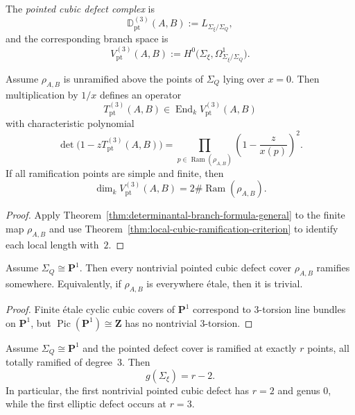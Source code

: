 \begin{definition}
\label{def:pointed-cubic-defect-complex}
The \emph{pointed cubic defect complex} is
\[
\mathbb D^{(3)}_{\mathrm{pt}}(A,B):=L_{\Sigma_{\xi}/\Sigma_Q},
\]
and the corresponding branch space is
\[
V^{(3)}_{\mathrm{pt}}(A,B):=
H^0\bigl(\Sigma_{\xi},\Omega^1_{\Sigma_{\xi}/\Sigma_Q}\bigr).
\]
\end{definition}

\begin{corollary}
\label{cor:pointed-cubic-defect-operator}
Assume $\rho_{A,B}$ is unramified above the points of $\Sigma_Q$ lying over
$x=0$.  Then multiplication by $1/x$ defines an operator
\[
T^{(3)}_{\mathrm{pt}}(A,B)
\in \operatorname{End}_k V^{(3)}_{\mathrm{pt}}(A,B)
\]
with characteristic polynomial
\[
\det\bigl(1-zT^{(3)}_{\mathrm{pt}}(A,B)\bigr)
=
\prod_{p\in \operatorname{Ram}(\rho_{A,B})}
\left(1-\frac{z}{x(p)}\right)^2.
\]
If all ramification points are simple and finite, then
\[
\dim_k V^{(3)}_{\mathrm{pt}}(A,B)
=2\#\operatorname{Ram}(\rho_{A,B}).
\]
\end{corollary}

\begin{proof}
Apply Theorem~\ref{thm:determinantal-branch-formula-general} to the finite map
$\rho_{A,B}$ and use Theorem~\ref{thm:local-cubic-ramification-criterion} to
identify each local length with~$2$.
\end{proof}

\begin{corollary}
\label{cor:no-etale-cubic-defect-rational-sheet}
Assume $\Sigma_Q\cong \mathbf P^1$.  Then every nontrivial pointed cubic defect
cover $\rho_{A,B}$ ramifies somewhere.  Equivalently, if
$\rho_{A,B}$ is everywhere étale, then it is trivial.
\end{corollary}

\begin{proof}
Finite étale cyclic cubic covers of $\mathbf P^1$ correspond to $3$-torsion line
bundles on $\mathbf P^1$, but
$\operatorname{Pic}(\mathbf P^1)\cong \mathbf Z$ has no nontrivial $3$-torsion.
\end{proof}

\begin{corollary}
\label{cor:genus-pointed-cubic-defect}
Assume $\Sigma_Q\cong \mathbf P^1$ and the pointed defect cover is ramified at
exactly $r$ points, all totally ramified of degree~$3$.  Then
\[
g(\Sigma_{\xi})=r-2.
\]
In particular, the first nontrivial pointed cubic defect has $r=2$ and genus
$0$, while the first elliptic defect occurs at $r=3$.
\end{corollary}

